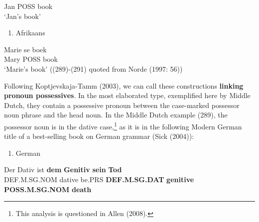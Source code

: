 Jan  POSS   book\\ %


‘Jan’s book’
\z


\begin{enumerate} %
\item 
\label{bkm:Ref151373831}Afrikaans 

\end{enumerate} %
\ea\label{}
\gll Marie  se  boek\\


Mary  POSS  book\\ %


‘Marie’s book’ ((289){}-(291) quoted from Norde (1997: 56))
\z

Following Koptjevskaja-Tamm (2003), we can call these constructions \textbf{linking pronoun possessives}. In the most elaborated type, exemplified here by Middle Dutch, they contain a possessive pronoun between the case-marked possessor noun phrase and the head noun. In the Middle Dutch example (289), the possessor noun is in the dative case,\footnote{ This analysis is questioned in Allen (2008).} as it is in the following Modern German title of a best-selling book on German grammar (Sick (2004)):

\begin{enumerate} %
\item 
\label{bkm:Ref126571195}German

\end{enumerate} %
\ea\label{}
\gll Der  Dativ  ist  \textbf{dem}\textbf{  Genitiv}\textbf{  sein}\textbf{  Tod}\\


DEF.M.SG.NOM  dative  be.PRS  \textbf{DEF.M.SG.DAT} \textbf{genitive} \textbf{POSS.M.SG.NOM} \textbf{death}\\ %


